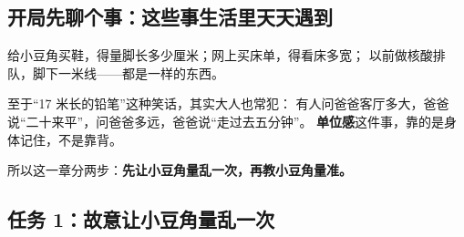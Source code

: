 \subsection{开局先聊个事：这些事生活里天天遇到}

给小豆角买鞋，得量脚长多少厘米；网上买床单，得看床多宽；
以前做核酸排队，脚下一米线——都是一样的东西。

至于“17 米长的铅笔”这种笑话，其实大人也常犯：
有人问爸爸客厅多大，爸爸说“二十来平”，问爸爸多远，爸爸说“走过去五分钟”。
\textbf{单位感}这件事，靠的是身体记住，不是靠背。

所以这一章分两步：\textbf{先让小豆角量乱一次，再教小豆角量准。}

\subsection{任务 1：故意让小豆角量乱一次}


